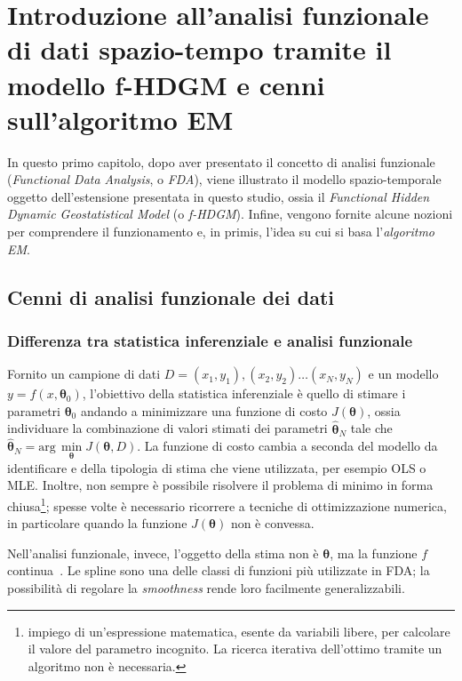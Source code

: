 \chapter[Il modello f-HDGM e l'algoritmo EM]{Introduzione all'analisi funzionale di dati spazio-tempo tramite il modello f-HDGM e cenni sull'algoritmo EM}

In questo primo capitolo, dopo aver presentato il concetto di analisi funzionale (\textit{Functional Data Analysis}, o \textit{FDA}), viene illustrato il modello spazio-temporale oggetto dell'estensione presentata in questo studio, ossia il \textit{Functional Hidden Dynamic Geostatistical Model} (o \textit{f-HDGM}). Infine, vengono fornite alcune nozioni per comprendere il funzionamento e, in primis, l'idea su cui si basa l'\textit{algoritmo EM}.

\section[Cenni di analisi funzionale dei dati]{Cenni di analisi funzionale dei dati}

\subsection[Differenza tra statistica inferenziale e analisi funzionale]{Differenza tra statistica inferenziale e analisi funzionale}
Fornito un campione di dati $D = (x_1, y_1), (x_2, y_2)\dots (x_N, y_N)$ e un modello $y = f(x, \boldsymbol{\theta}_0)$, l'obiettivo della statistica inferenziale è quello di stimare i parametri $\boldsymbol{\theta}_0$ andando a minimizzare una funzione di costo $J(\boldsymbol{\theta})$, ossia individuare la combinazione di valori stimati dei parametri $\boldsymbol{\hat{\theta}}_N$ tale che $\boldsymbol{\hat{\theta}}_N = \text{arg}\,\min\limits_{\boldsymbol{\theta}} J(\boldsymbol{\theta}, D)$. La funzione di costo cambia a seconda del modello da identificare e della tipologia di stima che viene utilizzata, per esempio OLS o MLE. Inoltre, non sempre è possibile risolvere il problema di minimo in forma chiusa\footnote{impiego di un'espressione matematica, esente da variabili libere, per calcolare il valore del parametro incognito. La ricerca iterativa dell'ottimo tramite un algoritmo non è necessaria.}; spesse volte è necessario ricorrere a tecniche di ottimizzazione numerica, in particolare quando la funzione $J(\boldsymbol{\theta})$ non è convessa. \par Nell'analisi funzionale, invece, l'oggetto della stima non è $\boldsymbol{\theta}$, ma la funzione $f$ continua~\cite{lezione_7}. Le spline sono una delle classi di funzioni più utilizzate in FDA; la possibilità di regolare  la \textit{smoothness} rende loro facilmente generalizzabili.

